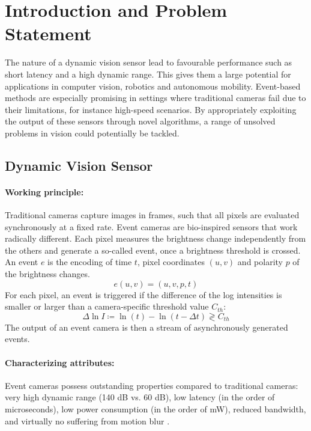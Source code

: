 \documentclass[10pt,twocolumn,letterpaper]{article}
\begin{document}
\section{Introduction and Problem Statement}

The nature of a dynamic vision sensor lead to favourable performance such as short latency and a high dynamic range. This gives them a large potential for applications in computer vision, robotics and autonomous mobility. Event-based methods are especially promising in settings where traditional cameras fail due to their limitations, for instance high-speed scenarios. By appropriately exploiting the output of these sensors through novel algorithms, a range of unsolved problems in vision could potentially be tackled. 


\subsection{Dynamic Vision Sensor}

\paragraph{Working principle:}
Traditional cameras capture images in frames, such that all pixels are evaluated synchronously at a fixed rate. Event cameras are bio-inspired sensors that work radically different. Each pixel measures the brightness change independently from the others and generate a so-called event, once a brightness threshold is crossed. An event $e$ is the encoding of time $t$, pixel coordinates $(u,v)$ and polarity $p$ of the brightness changes.
\begin{equation}
e(u,v) = (u,v,p,t)
\end{equation}
For each pixel, an event is triggered if the difference of the log intensities is smaller or larger than a camera-specific threshold value $C_{th}$:
\begin{equation}
    \Delta \ln{I} \coloneqq \ln{(t)} - \ln{(t-\Delta t) \gtrless
C_{th} } 
\end{equation}
The output of an event camera is then a stream of asynchronously generated events. 

\paragraph{Characterizing attributes:}
Event cameras possess outstanding properties compared to traditional cameras: very high dynamic range (140 dB vs. 60 dB), low latency (in the order of microseconds), low power consumption (in the order of mW), reduced bandwidth, and virtually no suffering from motion blur \cite{EventVisionReview}.
\end{document}
